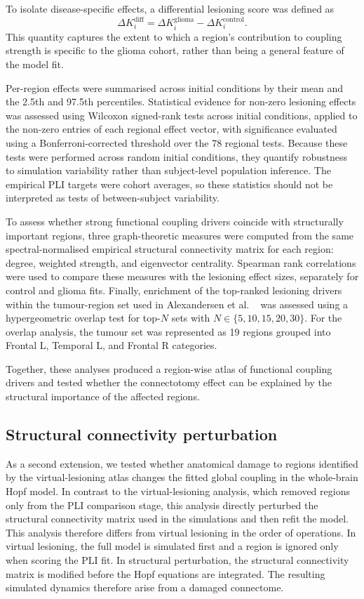\documentclass[11pt, reprint, aps, prl, floatfix, secnumarabic]{revtex4-2}
\begin{document}
To isolate disease-specific effects, a differential lesioning score was defined as
\begin{equation}
\Delta K_i^{\mathrm{diff}} = \Delta K_i^{\mathrm{glioma}} - \Delta K_i^{\mathrm{control}}.
\end{equation}
This quantity captures the extent to which a region's contribution to coupling strength is specific to the glioma cohort, rather than being a general feature of the model fit. 

Per-region effects were summarised across initial conditions by their mean and the 2.5th and 97.5th percentiles. Statistical evidence for non-zero lesioning effects was assessed using Wilcoxon signed-rank tests across initial conditions, applied to the non-zero entries of each regional effect vector, with significance evaluated using a Bonferroni-corrected threshold over the 78 regional tests. Because these tests were performed across random initial conditions, they quantify robustness to simulation variability rather than subject-level population inference. The empirical PLI targets were cohort averages, so these statistics should not be interpreted as tests of between-subject variability.

To assess whether strong functional coupling drivers coincide with structurally important regions, three graph-theoretic measures were computed from the same spectral-normalised empirical structural connectivity matrix for each region: degree, weighted strength, and eigenvector centrality. Spearman rank correlations were used to compare these measures with the lesioning effect sizes, separately for control and glioma fits. Finally, enrichment of the top-ranked lesioning drivers within the tumour-region set used in Alexandersen et al. ~\cite{Alexandersen2025} was assessed using a hypergeometric overlap test for top-$N$ sets with $N \in \{5,10,15,20,30\}$. For the overlap analysis, the tumour set was represented as 19 regions grouped into Frontal L, Temporal L, and Frontal R categories.

Together, these analyses produced a region-wise atlas of functional coupling drivers and tested whether the connectotomy effect can be explained by the structural importance of the affected regions.

\subsection{Structural connectivity perturbation}
As a second extension, we tested whether anatomical damage to regions identified by the virtual-lesioning atlas changes the fitted global coupling in the whole-brain Hopf model. In contrast to the virtual-lesioning analysis, which removed regions only from the PLI comparison stage, this analysis directly perturbed the structural connectivity matrix used in the simulations and then refit the model.
This analysis therefore differs from virtual lesioning in the order of operations. In virtual lesioning, the full model is simulated first and a region is ignored only when scoring the PLI fit. In structural perturbation, the structural connectivity matrix is modified before the Hopf equations are integrated. The resulting simulated dynamics therefore arise from a damaged connectome.
\end{document}
